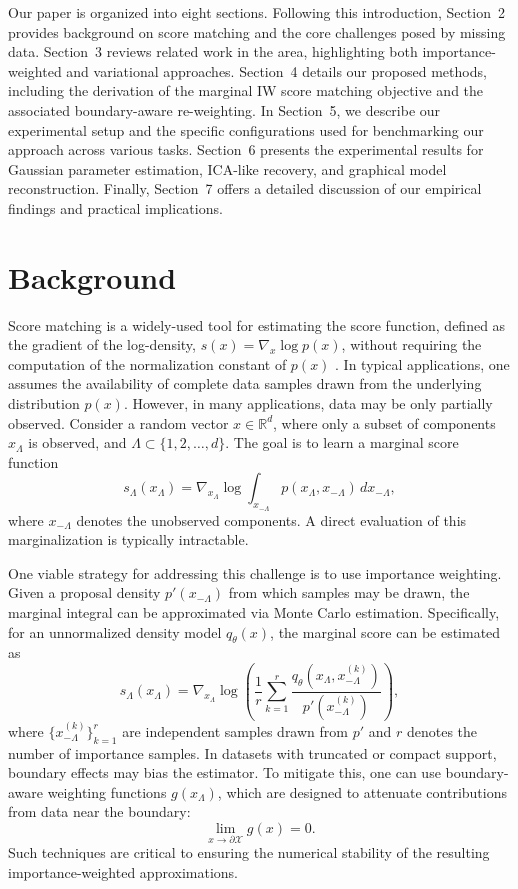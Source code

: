 \documentclass{article}
\begin{document}
Our paper is organized into eight sections. Following this introduction, Section~2 provides background on score matching and the core challenges posed by missing data. Section~3 reviews related work in the area, highlighting both importance-weighted and variational approaches. Section~4 details our proposed methods, including the derivation of the marginal IW score matching objective and the associated boundary-aware re-weighting. In Section~5, we describe our experimental setup and the specific configurations used for benchmarking our approach across various tasks. Section~6 presents the experimental results for Gaussian parameter estimation, ICA-like recovery, and graphical model reconstruction. Finally, Section~7 offers a detailed discussion of our empirical findings and practical implications.

\section{Background}
Score matching is a widely-used tool for estimating the score function, defined as the gradient of the log-density, $s(x) = \nabla_{x}\log p(x)$, without requiring the computation of the normalization constant of $p(x)$ \cite{hyvarinen2005estimation}. In typical applications, one assumes the availability of complete data samples drawn from the underlying distribution $p(x)$. However, in many applications, data may be only partially observed. Consider a random vector $x \in \mathbb{R}^d$, where only a subset of components $x_\Lambda$ is observed, and $\Lambda \subset \{1, 2, \dots, d\}$. The goal is to learn a marginal score function 
\[
s_\Lambda(x_\Lambda) = \nabla_{x_\Lambda} \log \int_{x_{-\Lambda}} p(x_\Lambda, x_{-\Lambda}) \,dx_{-\Lambda},
\]
where $x_{-\Lambda}$ denotes the unobserved components. A direct evaluation of this marginalization is typically intractable.

One viable strategy for addressing this challenge is to use importance weighting. Given a proposal density $p'(x_{-\Lambda})$ from which samples may be drawn, the marginal integral can be approximated via Monte Carlo estimation. Specifically, for an unnormalized density model $q_\theta(x)$, the marginal score can be estimated as
\[
\hat{s}_\Lambda(x_\Lambda) = \nabla_{x_\Lambda}\log\left(\frac{1}{r}\sum_{k=1}^{r}\frac{q_\theta(x_\Lambda,x^{(k)}_{-\Lambda})}{p'(x^{(k)}_{-\Lambda})}\right),
\]
where $\{x^{(k)}_{-\Lambda}\}_{k=1}^{r}$ are independent samples drawn from $p'$ and $r$ denotes the number of importance samples. In datasets with truncated or compact support, boundary effects may bias the estimator. To mitigate this, one can use boundary-aware weighting functions $g(x_\Lambda)$, which are designed to attenuate contributions from data near the boundary:
\[
\lim_{x\to\partial\mathcal{X}} g(x)=0.
\]
Such techniques are critical to ensuring the numerical stability of the resulting importance-weighted approximations.
\end{document}
